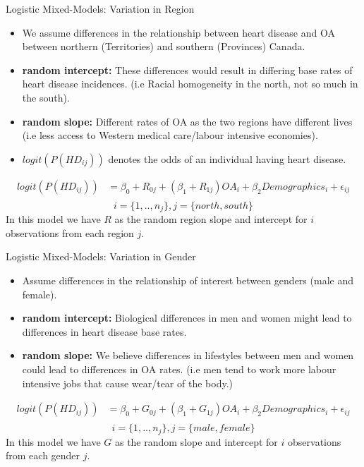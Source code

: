 \begin{frame}{Logistic Mixed-Models: Variation in Region}
\begin{itemize}
    \item We assume differences in the relationship between heart disease and OA between northern (Territories) and southern (Provinces) Canada. 
    \item \textbf{random intercept: } These differences would result in differing base rates of heart disease incidences. (i.e Racial homogeneity in the north, not so much in the south).
    \item \textbf{random slope: }Different rates of OA as the two regions have different lives (i.e less access to Western medical care/labour intensive economies).
    \item $logit(P(HD_{ij}))$ denotes the odds of an individual having heart disease.
\end{itemize}
\begin{align*}
    logit(P(HD_{ij}))&=\beta_0+R_{0j}+(\beta_1+R_{1j})OA_i +\beta_2Demographics_i+\epsilon_{ij}\\
\end{align*}
\begin{equation*}
    i=\{1,..,n_j\}, j=\{north,south\}
\end{equation*}
In this model we have $R$ as the random region slope and intercept for $i$ observations from each region $j$. 
\end{frame}

\begin{frame}{Logistic Mixed-Models: Variation in Gender}
\begin{itemize}
    \item Assume differences in the relationship of interest between genders (male and female).
    \item \textbf{random intercept: }Biological differences in men and women might lead to differences in heart disease base rates.
    \item \textbf{random slope: }We believe differences in lifestyles between men and women could lead to differences in OA rates. (i.e men tend to work more labour intensive jobs that cause wear/tear of the body.) 
\end{itemize}
\begin{align*}
    logit(P(HD_{ij}))&=\beta_0+G_{0j}+(\beta_1+G_{1j})OA_i +\beta_2Demographics_i+\epsilon_{ij}\\
\end{align*}
\begin{equation*}
    i=\{1,..,n_j\}, j=\{male,female\}
\end{equation*}
In this model we have $G$ as the random slope and intercept for $i$ observations from each gender $j$.
\end{frame}

